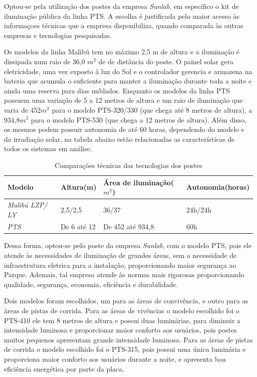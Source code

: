 	Optou-se pela utilização dos postes da empresa \textit{Sunlab}, em específico o kit de iluminação pública da linha PTS. A escolha é justificada pelo maior acesso às informaçoes técnicas que a empresa disponibiliza, quando comparada às outras empresas e tecnologias pesquisadas.
	
	Os modelos da linha Malibú tem  no máximo 2,5 m de altura e a iluminação é dissipada num raio de 36,0 $m^{2}$ de de distância do poste. O painel solar gera eletricidade, uma vez exposto à  luz do Sol e o controlador gerencia e armazena na bateria que acumula o suficiente para manter a iluminação durante toda a noite e ainda uma reserva para dias nublados. Enquanto os modelos da linha PTS possuem uma variação de 5 a 12 metros de altura e um raio de iluminação que varia de 452$m^{2}$ para o modelo PTS-320/330 (que chega até 8 metros de altura), a  934,8$m^{2}$ para o modelo PTS-530 (que chega a 12 metros de altura). Além disso, os mesmos podem possuir autonomia de até 60 horas, dependendo do modelo e da irradiação solar, na tabela abaixo estão relacionadas as características de todos os sistemas em análise.

\begin{table}[H]
\caption{Comparações técnicas das tecnologias dos postes}
\begin{tabular}{llll}
\hline
\multicolumn{1}{|l|}{\textbf{Modelo}} & \multicolumn{1}{l|}{\textbf{Altura(m)}} & \multicolumn{1}{l|}{\textbf{Área de iluminação($m^{2}$)}} & \multicolumn{1}{l|}{\textbf{Autonomia(horas)}} \\ \hline
\multicolumn{1}{|l|}{\textit{Malibú LZP/ LY}} & \multicolumn{1}{l|}{2,5/2,5} & \multicolumn{1}{l|}{36/37} & \multicolumn{1}{l|}{24h/24h} \\ \hline
\multicolumn{1}{|l|}{\textit{PTS}} & \multicolumn{1}{l|}{De 6 até 12} & \multicolumn{1}{l|}{De 452 até 934,8} & \multicolumn{1}{l|}{60h} \\ \hline
\end{tabular}
\end{table}

	Dessa forma, optou-se pelo poste da empresa \textit{Sunlab}, com o modelo PTS, pois ele atende às necessidades de iluminação de grandes áreas, sem a necessidade de infraestrutura eletrica para a instalação, proporcionando maior segurança ao Parque. Ademais, tal empresa atende às normas mais rigorosas proporcionando qualidade, segurança, economia, eficiência e durabilidade.
 
	Dois modelos foram escolhidos, um para as áreas de convivência, e outro para as áreas de pistas de corrida. Para as áreas de vivências o modelo escolhido foi o PTS-410 ele tem 8 metros de altura e possui duas luminárias, para diminuir a intensidade luminosa e proporcionar maior conforto aos usuários, pois postes muitos pequenos apresentam grande intensidade luminosa. Para as áreas de pistas de corrida o modelo escolhido foi o PTS-315, pois possui uma única luminária e proporciona maior conforto aos usuários durante a noite, e apresenta boa eficiência energética por parte da placa.

